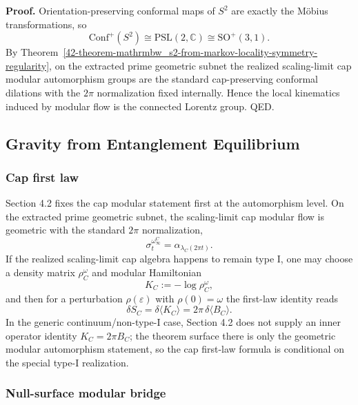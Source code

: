 \textbf{Proof.} Orientation-preserving conformal maps of \(S^2\) are exactly the M\"obius transformations, so
\[
\mathrm{Conf}^+(S^2)\cong \mathrm{PSL}(2,\mathbb C)\cong \mathrm{SO}^+(3,1).
\]
By Theorem~\ref{42-theorem-mathrmbw_s2-from-markov-locality-symmetry-regularity}, on the extracted prime geometric subnet the realized scaling-limit cap modular automorphism groups are the standard cap-preserving conformal dilations with the \(2\pi\) normalization fixed internally. Hence the local kinematics induced by modular flow is the connected Lorentz group. QED.
\subsection{Gravity from Entanglement Equilibrium}\label{5-gravity-from-entanglement-equilibrium}

\subsubsection{Cap first law}\label{51-cap-first-law}

Section 4.2 fixes the cap modular statement first at the automorphism level. On the extracted prime geometric subnet, the scaling-limit cap modular flow is geometric with the standard \(2\pi\) normalization,
\[
\sigma_t^{\omega_\infty^C}
=
\alpha_{\lambda_C(2\pi t)}.
\]
If the realized scaling-limit cap algebra happens to remain type I, one may choose a density matrix \(\rho_C^\omega\) and modular Hamiltonian
\[
K_C:=-\log\rho_C^\omega,
\]
and then for a perturbation \(\rho(\varepsilon)\) with \(\rho(0)=\omega\) the first-law identity reads
\[
\delta S_C=\delta\langle K_C\rangle
=
2\pi\,\delta\langle B_C\rangle.
\]
In the generic continuum/non-type-I case, Section 4.2 does not supply an inner operator identity \(K_C=2\pi B_C\); the theorem surface there is only the geometric modular automorphism statement, so the cap first-law formula is conditional on the special type-I realization.

\subsubsection{Null-surface modular bridge}\label{52-null-surface-modular-bridge}

